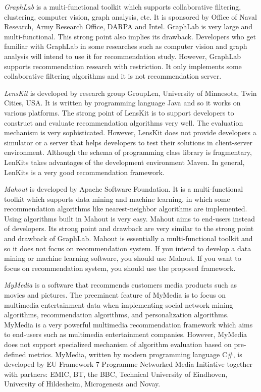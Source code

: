 \documentclass[a4paper]{llncs}
\begin{document}
\textit{GraphLab} \cite{graphlab} is a multi-functional toolkit which supports collaborative filtering, clustering, computer vision, graph analysis, etc. It is sponsored by Office of Naval Research, Army Research Office, DARPA and Intel. GraphLab is very large and multi-functional. This strong point also implies its drawback. Developers who get familiar with GraphLab in some researches such as computer vision and graph analysis will intend to use it for recommendation study. However, GraphLab supports recommendation research with restriction. It only implements some collaborative filtering algorithms and it is not recommendation server.

\textit{LensKit} \cite{lenskit} is developed by research group GroupLen, University of Minnesota, Twin Cities, USA. It is written by programming language Java and so it works on various platforms. The strong point of LensKit is to support developers to construct and evaluate recommendation algorithms very well. The evaluation mechanism is very sophisticated. However, LensKit does not provide developers a simulator or a server that helps developers to test their solutions in client-server environment. Although the schema of programming class library is fragmentary, LenKits takes advantages of the development environment Maven. In general, LenKits is a very good recommendation framework.

\textit{Mahout} \cite{mahout} is developed by Apache Software Foundation. It is a multi-functional toolkit which supports data mining and machine learning, in which some recommendation algorithms like nearest-neighbor algorithms are implemented. Using algorithms built in Mahout is very easy. Mahout aims to end-users instead of developers. Its strong point and drawback are very similar to the strong point and drawback of GraphLab. Mahout is essentially a multi-functional toolkit and so it does not focus on recommendation system. If you intend to develop a data mining or machine learning software, you should use Mahout. If you want to focus on recommendation system, you should use the proposed framework.

\textit{MyMedia} \cite{mymedia} is a software that recommends customers media products such as movies and pictures. The preeminent feature of MyMedia is to focus on multimedia entertainment data when implementing social network mining algorithms, recommendation algorithms, and personalization algorithms. MyMedia is a very powerful multimedia recommendation framework which aims to end-users such as multimedia entertainment companies. However, MyMedia does not support specialized mechanism of algorithm evaluation based on pre-defined metrics. MyMedia, written by modern programming language C\#, is developed by EU Framework 7 Programme Networked Media Initiative together with partners: EMIC, BT, the BBC, Technical University of Eindhoven, University of Hildesheim, Microgenesis and Novay.
\end{document}
